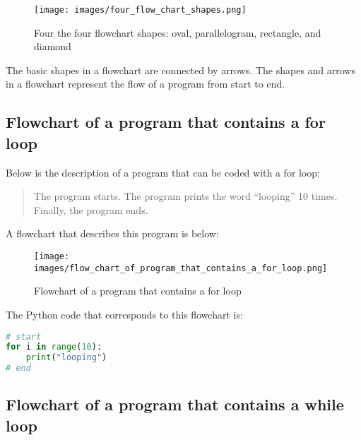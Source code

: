 \documentclass{book}
\makeatletter
\def\maxwidth{\ifdim\Gin@nat@width>\linewidth\linewidth
\else\Gin@nat@width\fi}
\let\Oldincludegraphics\includegraphics
\renewcommand{\includegraphics}[1]{\Oldincludegraphics[width=.8\maxwidth]{#1}}
\makeatother
\begin{document}
\begin{figure}
\centering
\texttt{[image: images/four\_flow\_chart\_shapes.png]}
\caption{Four the four flowchart shapes: oval, parallelogram, rectangle,
and diamond}
\end{figure}

The basic shapes in a flowchart are connected by arrows. The shapes and
arrows in a flowchart represent the flow of a program from start to end.
    




    
        \hypertarget{flowchart-of-a-program-that-contains-a-for-loop}{%
\subsection{Flowchart of a program that contains a for
loop}\label{flowchart-of-a-program-that-contains-a-for-loop}}
    




    
        Below is the description of a program that can be coded with a for loop:

\begin{quote}
The program starts. The program prints the word ``looping'' 10 times.
Finally, the program ends.
\end{quote}

A flowchart that describes this program is below:

\begin{figure}
\centering
\texttt{[image: images/flow\_chart\_of\_program\_that\_contains\_a\_for\_loop.png]}
\caption{Flowchart of a program that contains a for loop}
\end{figure}

The Python code that corresponds to this flowchart is:

\begin{lstlisting}[language=Python]
# start
for i in range(10):
    print("looping")
# end
\end{lstlisting}
    




    
        \hypertarget{flowchart-of-a-program-that-contains-a-while-loop}{%
\subsection{Flowchart of a program that contains a while
loop}\label{flowchart-of-a-program-that-contains-a-while-loop}}
    
\end{document}
